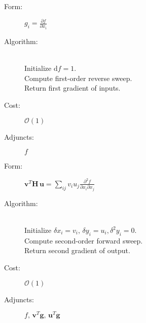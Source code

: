 \begin{tcolorbox}[colback=white,colframe=gray90, coltitle=black,boxrule=3pt,
fonttitle=\bfseries,title=Gradient]
	
	\begin{description}
		\item[Form:] $\displaystyle g_{i} = \frac{ \partial f }{ \partial x_{i} } $
		\item[Algorithm:] \hfill \\
		Initialize $\mathrm{d} f = 1$. \\
		Compute first-order reverse sweep. \\
		Return first gradient of inputs.
		\item[Cost:] $\mathcal{O} \! \left( 1 \right)$
		\item[Adjuncts:] $ f $
	\end{description}
	
\end{tcolorbox}

\begin{tcolorbox}[colback=white,colframe=gray90, coltitle=black,boxrule=3pt,
fonttitle=\bfseries,title=Hessian Quadratic Form]

	\begin{description}
		\item[Form:] 
		$\displaystyle \mathbf{v}^{T} \mathbf{H} \, \mathbf{u} = \sum_{ij} v_{i} u_{j} \frac{ \partial^{2} f }{ \partial x_{i} \partial x_{j} } $
		\item[Algorithm:] \hfill \\
		Initialize $\delta x_{i} = v_{i}, \, \delta y_{i} = u_{i}, \delta^{2} y_{i} = 0$. \\
		Compute second-order forward sweep. \\
		Return second gradient of output.
		\item[Cost:] $\mathcal{O} \! \left( 1 \right)$
		\item[Adjuncts:] $ f, \, \mathbf{v}^{T} \mathbf{g}, \, \mathbf{u}^{T} \mathbf{g}$
	\end{description}
	
\end{tcolorbox}

